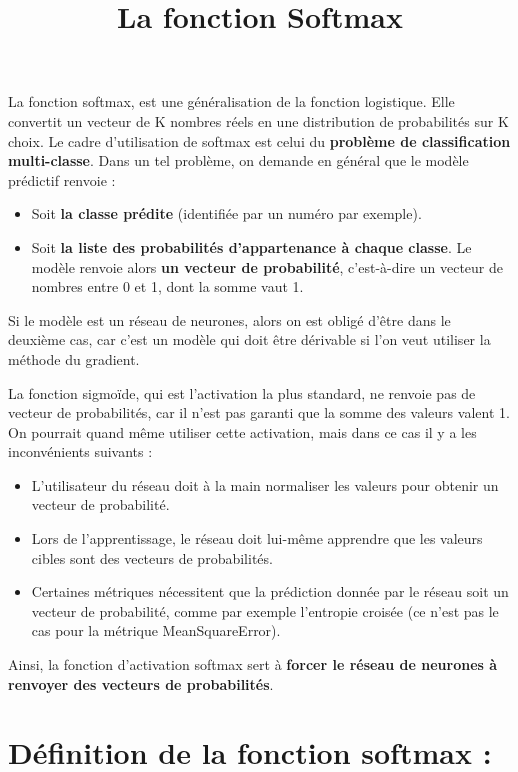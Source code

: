 \documentclass{article}
\title{La fonction Softmax}
\begin{document}
\maketitle


La fonction softmax, est une généralisation de la fonction logistique. Elle convertit un vecteur de K nombres réels en une distribution de probabilités sur K choix.
Le cadre d’utilisation de softmax est celui du \textbf{problème de classification multi-classe}. Dans un tel problème, on demande en général que le modèle prédictif renvoie :
\begin{itemize}
    \item Soit \textbf{la classe prédite} (identifiée par un numéro par exemple).
    \item Soit \textbf{la liste des probabilités d’appartenance à chaque classe}. Le modèle renvoie alors \textbf{un vecteur de probabilité}, c’est-à-dire un vecteur de nombres entre 0 et 1, dont la somme vaut 1.
\end{itemize}

Si le modèle est un réseau de neurones, alors on est obligé d’être dans le deuxième cas, car c’est un modèle qui doit être dérivable si l’on veut utiliser la méthode du gradient.

La fonction sigmoïde, qui est l’activation la plus standard, ne renvoie pas de vecteur de probabilités, car il n’est pas garanti que la somme des valeurs valent 1. On pourrait quand même utiliser cette activation, mais dans ce cas il y a les inconvénients suivants :
\begin{itemize}
    \item L’utilisateur du réseau doit à la main normaliser les valeurs pour obtenir un vecteur de probabilité.
    \item Lors de l’apprentissage, le réseau doit lui-même apprendre que les valeurs cibles sont des vecteurs de probabilités.
    \item Certaines métriques nécessitent que la prédiction donnée par le réseau soit un vecteur de probabilité, comme par exemple l’entropie croisée (ce n’est pas le cas pour la métrique MeanSquareError).
\end{itemize}

Ainsi, la fonction d’activation softmax sert à \textbf{forcer le réseau de neurones à renvoyer des vecteurs de probabilités}.

\section*{Définition de la fonction softmax :}
\end{document}
